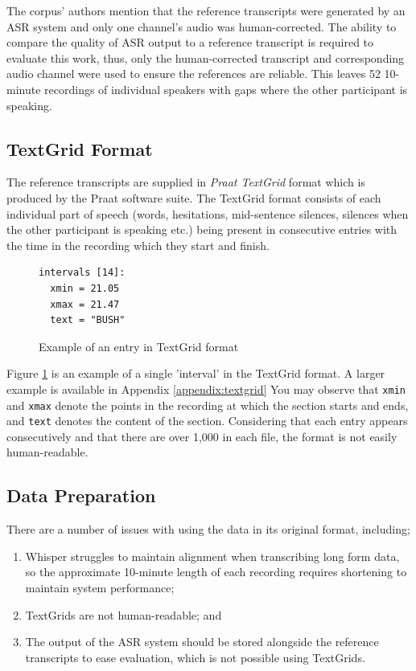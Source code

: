 The corpus' authors mention that the reference transcripts were generated by an ASR system and only one channel's audio was human-corrected.
The ability to compare the quality of ASR output to a reference transcript is required to evaluate this work, thus, only the human-corrected transcript and corresponding audio channel were used to ensure the references are reliable.
This leaves 52 10-minute recordings of individual speakers with gaps where the other participant is speaking.

\subsection{TextGrid Format}

The reference transcripts are supplied in \emph{Praat TextGrid} format which is produced by the Praat software suite\cite{praat}.
The TextGrid format consists of each individual part of speech (words, hesitations, mid-sentence silences, silences when the other participant is speaking etc.) being present in consecutive entries with the time in the recording which they start and finish.

\begin{figure}[h!]
\centering
\begin{BVerbatim}
intervals [14]:
  xmin = 21.05 
  xmax = 21.47 
  text = "BUSH" 
\end{BVerbatim}
  \caption{Example of an entry in TextGrid format}
  \label{fig:textgrid-example}
\end{figure}

Figure \ref{fig:textgrid-example} is an example of a single 'interval' in the TextGrid format.
A larger example is available in Appendix \ref{appendix:textgrid}
You may observe that \texttt{xmin} and \texttt{xmax} denote the points in the recording at which the section starts and ends, and \texttt{text} denotes the content of the section.
Considering that each entry appears consecutively and that there are over 1,000 in each file, the format is not easily human-readable.

\subsection{Data Preparation}

There are a number of issues with using the data in its original format, including;

\begin{enumerate}
  \item Whisper struggles to maintain alignment when transcribing long form data\cite{whisper}, so the approximate 10-minute length of each recording requires shortening to maintain system performance;
  \item TextGrids are not human-readable; and
  \item The output of the ASR system should be stored alongside the reference transcripts to ease evaluation, which is not possible using TextGrids.
\end{enumerate}

